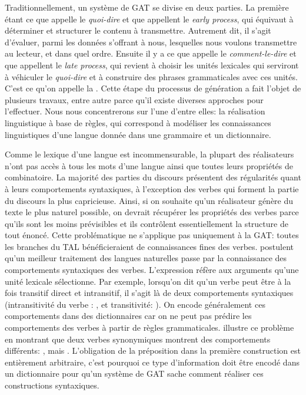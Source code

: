 Traditionnellement, un système de \ac{GAT} se divise en deux parties. La première étant ce que \cite{DanlosPresentationmodelegeneration1983} appelle le \emph{quoi-dire} et que \cite{gatt18} appellent le \emph{early process}, qui équivaut à déterminer et structurer le contenu à transmettre. Autrement dit, il s'agit d'évaluer, parmi les données s'offrant à nous, lesquelles nous voulons transmettre au lecteur, et dans quel ordre. Ensuite il y a ce que \citeauthor{DanlosPresentationmodelegeneration1983} appelle le \emph{comment-le-dire} et que \citeauthor{gatt18} appellent le \emph{late process}, qui revient à choisir les unités lexicales qui serviront à véhiculer le \emph{quoi-dire} et à construire des phrases grammaticales avec ces unités. C'est ce qu'on appelle la . Cette étape du processus de génération a fait l'objet de plusieurs travaux, entre autre parce qu'il existe diverses approches pour l'effectuer. Nous nous concentrerons sur l'une d'entre elles: la réalisation linguistique à base de règles, qui correspond à modéliser les connaissances linguistiques d'une langue donnée dans une grammaire et un dictionnaire.

Comme le lexique d'une langue est incommensurable, la plupart des réalisateurs n'ont pas accès à tous les mots d'une langue ainsi que toutes leurs propriétés de combinatoire. La majorité des parties du discours présentent des régularités quant à leurs comportements syntaxiques, à l'exception des verbes qui forment la partie du discours la plus capricieuse. Ainsi, si on souhaite qu'un réalisateur génère du texte le plus naturel possible, on devrait récupérer les propriétés des verbes parce qu'ils sont les moins prévisibles et ils contrôlent essentiellement la structure de tout énoncé. Cette problématique ne s'applique pas uniquement à la \ac{GAT}: toutes les branches du \ac{TAL} bénéficieraient de connaissances fines des verbes. \cite{Korhonenlargesubcategorizationlexicon2006, SchulerVerbnetBroadcoverageComprehensive2005} postulent qu'un meilleur traitement des langues naturelles passe par la connaissance des comportements syntaxiques des verbes. L'expression  réfère aux arguments qu'une unité lexicale sélectionne. Par exemple, lorsqu'on dit qu'un verbe peut être à la fois transitif direct et intransitif, il s'agit là de deux comportements syntaxiques (intransitivité du verbe : , et transitivité: ). On encode généralement ces comportements dans des dictionnaires car on ne peut pas prédire les comportements des verbes à partir de règles grammaticales. \cite{MilicevicSchemaregimepont2009} illustre ce problème en montrant que deux verbes synonymiques montrent des comportements différents: , mais . L'obligation de la préposition dans la première construction est entièrement arbitraire, c'est pourquoi ce type d'information doit être encodé dans un dictionnaire pour qu'un système de \ac{GAT} sache comment réaliser ces constructions syntaxiques.

